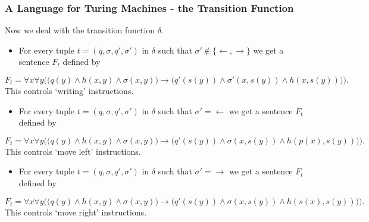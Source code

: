 \documentclass[handout]{beamer}
\newcommand{\ra}{\rightarrow}
\newcommand{\la}{\leftarrow}
\begin{document}
\begin{frame}
\frametitle{A Language for Turing Machines - the Transition Function} 
Now we deal with the transition function $\delta$.
\begin{itemize}
\item For every tuple $t=(q,\sigma,q',\sigma')$ in $\delta$ such that $\sigma'\notin\{\la,\ra\}$ we get a sentence $F_t$ defined by
\end{itemize}
\scriptsize
\begin{equation*}
F_t=\forall x\forall y\Big(\big(q(y)\wedge h(x,y)\wedge \sigma(x,y)\big)\ra \big(q'(s(y))\wedge \sigma'(x,s(y))\wedge h(x,s(y))\big) \Big).
\end{equation*}
\normalsize
This controls `writing' instructions.

\begin{itemize}
\item For every tuple $t=(q,\sigma,q',\sigma')$ in $\delta$ such that $\sigma'=\la$ we get a sentence $F_t$ defined by 
\end{itemize}
\scriptsize
\begin{equation*}
F_t=\forall x\forall y\Big(\big(q(y)\wedge h(x,y)\wedge \sigma(x,y)\big)\ra \big(q'(s(y))\wedge \sigma(x,s(y))\wedge h(p(x),s(y))\big) \Big).
\end{equation*}
\normalsize
This controls `move left' instructions.

\begin{itemize}
\item For every tuple $t=(q,\sigma,q',\sigma')$ in $\delta$ such that $\sigma'=\ra$ we get a sentence $F_t$ defined by 
\end{itemize}
\scriptsize
\begin{equation*}
F_t=\forall x\forall y\Big(\big(q(y)\wedge h(x,y)\wedge \sigma(x,y)\big)\ra (q'(s(y))\wedge \sigma(x,s(y))\wedge h(s(x),s(y))\big) \Big).
\end{equation*}
\normalsize
This controls `move right' instructions.

\end{frame}
\end{document}

